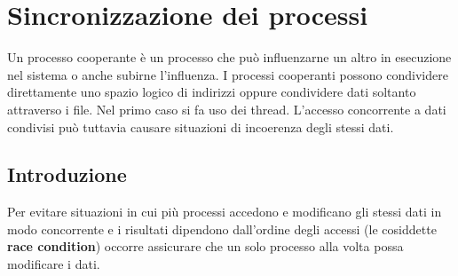 \documentclass[11pt,a4paper]{article}
\begin{document}
\section{Sincronizzazione dei processi}
Un processo cooperante è un processo che può influenzarne un altro in esecuzione nel siste­ma o anche subirne l'influenza. I processi cooperanti possono condividere direttamente uno
spazio logico di indirizzi oppure condividere dati soltanto attraverso i fi­le. Nel primo caso si fa uso dei thread. L'accesso concorrente a da­ti condivisi può tuttavia causare situazioni di incoerenza degli stessi dati.

\subsection{Introduzione}
Per evitare situazioni in cui più processi accedono e modificano gli
stessi dati in modo concorrente e i risultati dipendono dall'ordine degli accessi (le cosiddet­te \textbf{race condition}) occorre assicurare che un solo processo alla volta possa modificare i dati.
\end{document}
